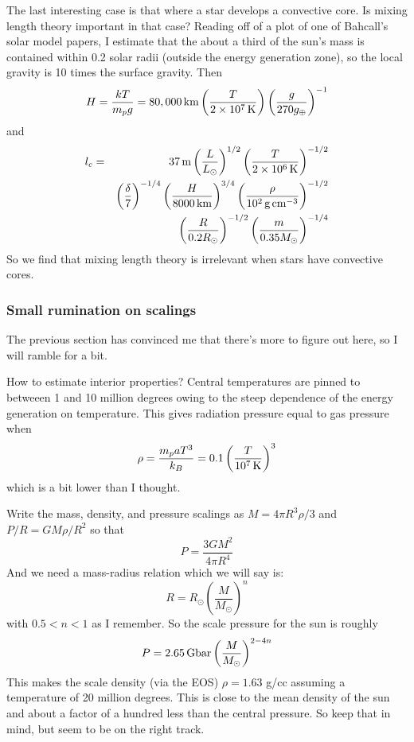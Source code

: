 \documentclass{emulateapj}
\newcommand{\scale}[2]{\left(\frac{#1}{#2}\right)}
\newcommand{\unit}[1]{\,\hbox{#1}}
\begin{document}
The last interesting case is that where a star develops a convective
core.  Is mixing length theory important in that case?  Reading off of
a plot of one of Bahcall's solar model papers, I estimate that the
about a third of the sun's mass is contained within 0.2 solar radii
(outside the energy generation zone), so the local gravity is 10 times
the surface gravity.  Then
\begin{equation}
  H = \frac{kT}{m_p g} 
  = 80,000 \unit {km} 
  \scale{T}{2\times 10^{7} \unit K}
  \scale{g}{270 g_\oplus}^{-1}
\end{equation}
and 
\begin{eqnarray}
l_c &=& 37 \unit{m} 
  \scale{L}{L_\odot}^{1/2}
  \scale{T}{2\times 10^6 \unit{K}}^{-1/2}
\nonumber \\
& &
  \scale{\delta}{7}^{-1/4} 
  \scale{H}{8000 \unit{km}}^{3/4} 
  \scale{\rho}{10^2 \unit{g}\unit{cm}^{-3}}^{-1/2} 
\nonumber \\
& &
  \scale{R}{0.2 R_\odot}^{-1/2}
  \scale{m}{0.35 M_\odot}^{-1/4} 
\end{eqnarray}
So we find that mixing length theory is irrelevant when stars have
convective cores.

\subsubsection{Small rumination on scalings}
The previous section has convinced me that there's more to figure out
here, so I will ramble for a bit.  

How to estimate interior properties?  Central temperatures are pinned to
betweeen 1 and 10 million degrees owing to the steep dependence of the
energy generation on temperature.  This gives radiation pressure
equal to gas pressure when
\begin{equation}
  \rho = \frac{m_p a T^3}{k_B} = 0.1 \scale{T}{10^7 \unit{K}}^3
\end{equation}
which is a bit lower than I thought.  

Write the mass, density, and pressure scalings as $M = 4\pi R^3 \rho /
3$ and $P/R = G M \rho / R^2$ so that
\begin{equation}
  P = \frac{3 G M^2}{4 \pi R^4}
\end{equation}
And we need a mass-radius relation which we will say is:
\begin{equation}
  R = R_\odot \scale{M}{M_\odot}^n
\end{equation}
with $0.5 < n < 1$ as I remember. So the scale pressure for the sun
 is roughly
\begin{equation}
  P = 2.65 \unit{Gbar} \scale{M}{M_\odot}^{2-4n}
\end{equation}
This makes the scale density (via the EOS) $\rho = 1.63$ g/cc assuming
a temperature of 20 million degrees.  This is close to the mean
density of the sun and about a factor of a hundred less than the
central pressure.  So keep that in mind, but seem to be on the right
track.
\end{document}
